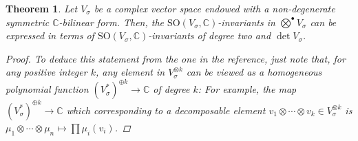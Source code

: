 \documentclass[11pt,twoside,a4paper]{amsart}
\newcommand{\0}{\mathscr{O}}
\newcommand{\C}{\mathbb{C}}
\newcommand{\s}{\sigma}
\theoremstyle{plain}
\newtheorem{thm}{Theorem}[section]
\theoremstyle{definition}
\theoremstyle{remark}
\begin{document}
\begin{thm}\cite[Thm.\ 10.2]{kraft1996classical}
\label{Thm: invariants of SO(n)}
Let $V_\s$ be a complex vector space endowed with a non-degenerate symmetric $\C$-bilinear form.
Then, the $\mathrm{SO}(V_\s,\C)$-invariants in $\bigotimes^{\bullet}V_\s$ can be expressed in terms of $\mathrm{SO}(V_\s,\C)$-invariants of degree two and $\det V_\s$.
\begin{proof}
To deduce this statement from the one in the reference, just note that, for any positive integer $k$, any element in $V_\sigma^{\otimes k}$ can be viewed as a homogeneous polynomial function $(V_\s^*)^{\oplus k}\rightarrow \C$ of degree $k$: For example, the map $(V_\s^*)^{\oplus k}\rightarrow \C$ which corresponding to a decomposable element $v_1\otimes\cdots\otimes v_k\in V_\sigma^{\otimes k}$ is $\mu_1\otimes\cdots\otimes \mu_n\mapsto \prod \mu_i(v_i)$.
\end{proof}
\end{thm}
\end{document}
